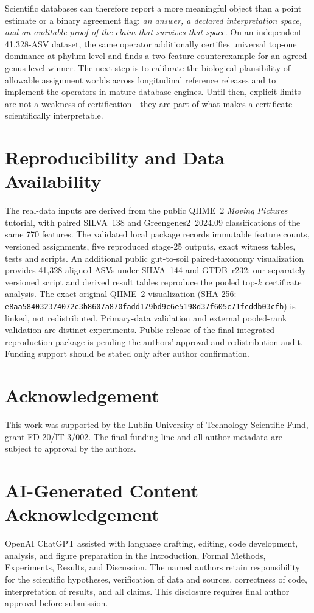\documentclass[conference]{IEEEtran}
\begin{document}
Scientific databases can therefore report a more meaningful object than a point estimate or a binary agreement flag: \emph{an answer, a declared interpretation space, and an auditable proof of the claim that survives that space}. On an independent 41,328-ASV dataset, the same operator additionally certifies universal top-one dominance at phylum level and finds a two-feature counterexample for an agreed genus-level winner. The next step is to calibrate the biological plausibility of allowable assignment worlds across longitudinal reference releases and to implement the operators in mature database engines. Until then, explicit limits are not a weakness of certification---they are part of what makes a certificate scientifically interpretable.

\section*{Reproducibility and Data Availability}
The real-data inputs are derived from the public QIIME~2 \emph{Moving Pictures} tutorial, with paired SILVA~138 and Greengenes2~2024.09 classifications of the same 770 features. The validated local package records immutable feature counts, versioned assignments, five reproduced stage-25 outputs, exact witness tables, tests and scripts. An additional public gut-to-soil paired-taxonomy visualization provides 41,328 aligned ASVs under SILVA~144 and GTDB~r232; our separately versioned script and derived result tables reproduce the pooled top-$k$ certificate analysis. The exact original QIIME~2 visualization (SHA-256: \texttt{e8aa584032374072c3b8607a870fadd1}\allowbreak\texttt{79bd9c6e5198d37f605c71fcddb03cfb}) is linked, not redistributed. Primary-data validation and external pooled-rank validation are distinct experiments. Public release of the final integrated reproduction package is pending the authors' approval and redistribution audit. Funding support should be stated only after author confirmation.

\section*{Acknowledgement}
This work was supported by the Lublin University of Technology Scientific Fund, grant FD-20/IT-3/002. The final funding line and all author metadata are subject to approval by the authors.

\section*{AI-Generated Content Acknowledgement}
OpenAI ChatGPT assisted with language drafting, editing, code development, analysis, and figure preparation in the Introduction, Formal Methods, Experiments, Results, and Discussion. The named authors retain responsibility for the scientific hypotheses, verification of data and sources, correctness of code, interpretation of results, and all claims. This disclosure requires final author approval before submission.
\end{document}
